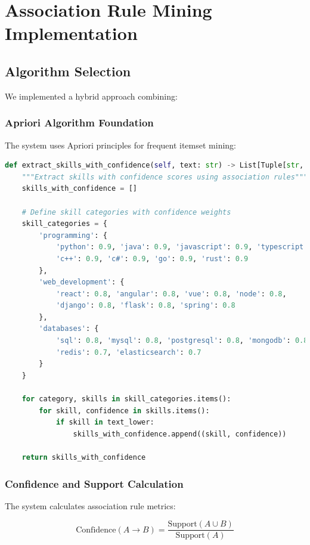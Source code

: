 \documentclass[12pt,a4paper]{article}
\begin{document}
\section{Association Rule Mining Implementation}

\subsection{Algorithm Selection}
We implemented a hybrid approach combining:

\subsubsection{Apriori Algorithm Foundation}
The system uses Apriori principles for frequent itemset mining:
\begin{lstlisting}[language=Python, caption=Apriori-based Association Rule Mining]
def extract_skills_with_confidence(self, text: str) -> List[Tuple[str, float]]:
    """Extract skills with confidence scores using association rules"""
    skills_with_confidence = []
    
    # Define skill categories with confidence weights
    skill_categories = {
        'programming': {
            'python': 0.9, 'java': 0.9, 'javascript': 0.9, 'typescript': 0.9,
            'c++': 0.9, 'c#': 0.9, 'go': 0.9, 'rust': 0.9
        },
        'web_development': {
            'react': 0.8, 'angular': 0.8, 'vue': 0.8, 'node': 0.8,
            'django': 0.8, 'flask': 0.8, 'spring': 0.8
        },
        'databases': {
            'sql': 0.8, 'mysql': 0.8, 'postgresql': 0.8, 'mongodb': 0.8,
            'redis': 0.7, 'elasticsearch': 0.7
        }
    }
    
    for category, skills in skill_categories.items():
        for skill, confidence in skills.items():
            if skill in text_lower:
                skills_with_confidence.append((skill, confidence))
    
    return skills_with_confidence
\end{lstlisting}

\subsubsection{Confidence and Support Calculation}
The system calculates association rule metrics:

\begin{equation}
\text{Confidence}(A \rightarrow B) = \frac{\text{Support}(A \cup B)}{\text{Support}(A)}
\end{equation}
\end{document}
